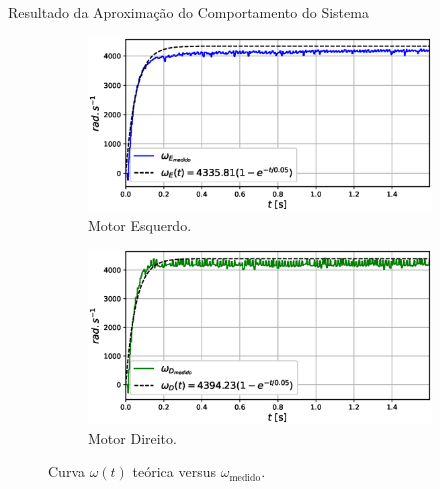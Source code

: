 \begin{frame}{Resultado da Aproximação do Comportamento do Sistema}


\begin{figure}
    \begin{subfigure}{.48\textwidth}
        \centering
        \includegraphics[width=1.15\textwidth]{figuras/resultados/exp03/regressao_vs_medido_esquerdo100.eps}
        \caption{Motor Esquerdo.}
    \end{subfigure}
    \begin{subfigure}{.48\textwidth}
        \centering
        \includegraphics[width=1.15\textwidth]{figuras/resultados/exp03/regressao_vs_medido_direito100.eps}
        \caption{Motor Direito.}
    \end{subfigure}
    \caption{Curva $\omega(t)$ teórica versus $\omega_{\text{medido}}$.}
\end{figure}
    
\end{frame}


